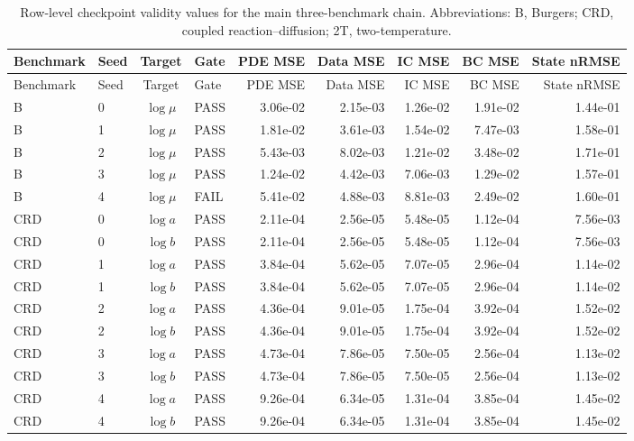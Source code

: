 \documentclass[preprint,12pt]{elsarticle}
\begin{document}
\begin{landscape}
\begingroup
\small
\setlength{\tabcolsep}{4pt}
\renewcommand{\arraystretch}{1.08}
\begin{longtable}{llclrrrrr}
\caption{Row-level checkpoint validity values for the main three-benchmark chain.  Abbreviations: B, Burgers; CRD, coupled reaction--diffusion; 2T, two-temperature.}
\label{tab:s3_validity_rows}\\
\toprule
Benchmark & Seed & Target & Gate & PDE MSE & Data MSE & IC MSE & BC MSE & State nRMSE \\
\midrule
\endfirsthead
\toprule
Benchmark & Seed & Target & Gate & PDE MSE & Data MSE & IC MSE & BC MSE & State nRMSE \\
\midrule
\endhead
B & 0 & $\log\mu$ & PASS & 3.06e-02 & 2.15e-03 & 1.26e-02 & 1.91e-02 & 1.44e-01 \\
B & 1 & $\log\mu$ & PASS & 1.81e-02 & 3.61e-03 & 1.54e-02 & 7.47e-03 & 1.58e-01 \\
B & 2 & $\log\mu$ & PASS & 5.43e-03 & 8.02e-03 & 1.21e-02 & 3.48e-02 & 1.71e-01 \\
B & 3 & $\log\mu$ & PASS & 1.24e-02 & 4.42e-03 & 7.06e-03 & 1.29e-02 & 1.57e-01 \\
B & 4 & $\log\mu$ & FAIL & 5.41e-02 & 4.88e-03 & 8.81e-03 & 2.49e-02 & 1.60e-01 \\
CRD & 0 & $\log a$ & PASS & 2.11e-04 & 2.56e-05 & 5.48e-05 & 1.12e-04 & 7.56e-03 \\
CRD & 0 & $\log b$ & PASS & 2.11e-04 & 2.56e-05 & 5.48e-05 & 1.12e-04 & 7.56e-03 \\
CRD & 1 & $\log a$ & PASS & 3.84e-04 & 5.62e-05 & 7.07e-05 & 2.96e-04 & 1.14e-02 \\
CRD & 1 & $\log b$ & PASS & 3.84e-04 & 5.62e-05 & 7.07e-05 & 2.96e-04 & 1.14e-02 \\
CRD & 2 & $\log a$ & PASS & 4.36e-04 & 9.01e-05 & 1.75e-04 & 3.92e-04 & 1.52e-02 \\
CRD & 2 & $\log b$ & PASS & 4.36e-04 & 9.01e-05 & 1.75e-04 & 3.92e-04 & 1.52e-02 \\
CRD & 3 & $\log a$ & PASS & 4.73e-04 & 7.86e-05 & 7.50e-05 & 2.56e-04 & 1.13e-02 \\
CRD & 3 & $\log b$ & PASS & 4.73e-04 & 7.86e-05 & 7.50e-05 & 2.56e-04 & 1.13e-02 \\
CRD & 4 & $\log a$ & PASS & 9.26e-04 & 6.34e-05 & 1.31e-04 & 3.85e-04 & 1.45e-02 \\
CRD & 4 & $\log b$ & PASS & 9.26e-04 & 6.34e-05 & 1.31e-04 & 3.85e-04 & 1.45e-02 \\

\end{longtable}
\end{landscape}
\end{document}
